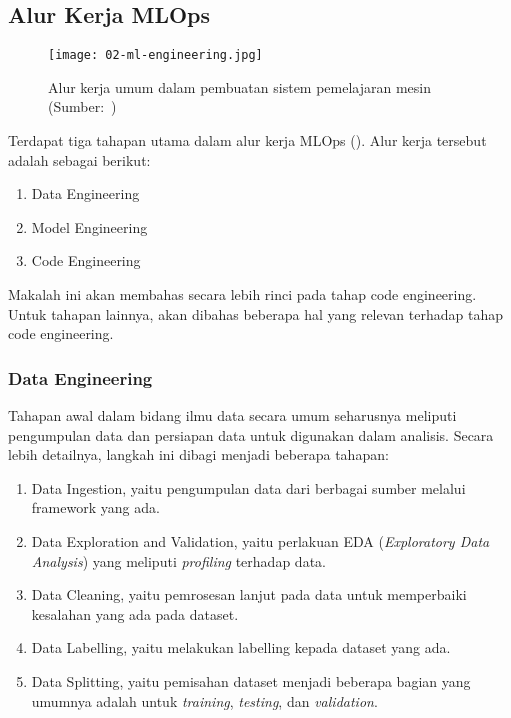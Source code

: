 \subsection{Alur Kerja MLOps}

\begin{figure}[ht]
  \vspace{\baselineskip}
  \centering
  \texttt{[image: 02-ml-engineering.jpg]}
  \captionsetup{justification=centering}
  \caption{Alur kerja umum dalam pembuatan sistem pemelajaran mesin (Sumber:~\cite{mlopsorg})}
\end{figure}

Terdapat tiga tahapan utama dalam alur kerja MLOps (\cite{mlopsorg}).
Alur kerja tersebut adalah sebagai berikut:
\begin{enumerate}
  \item Data Engineering
  \item Model Engineering
  \item Code Engineering
\end{enumerate}

Makalah ini akan membahas secara lebih rinci pada tahap code engineering.
Untuk tahapan lainnya, akan dibahas beberapa hal yang relevan terhadap tahap code engineering.

\subsubsection{Data Engineering}

Tahapan awal dalam bidang ilmu data secara umum seharusnya meliputi pengumpulan data dan persiapan data untuk digunakan dalam analisis.
Secara lebih detailnya, langkah ini dibagi menjadi beberapa tahapan:
\begin{enumerate}
  \item Data Ingestion, yaitu pengumpulan data dari berbagai sumber melalui framework yang ada. 
  \item Data Exploration and Validation, yaitu perlakuan EDA (\textit{Exploratory Data Analysis}) yang meliputi \textit{profiling} terhadap data.
  \item Data Cleaning, yaitu pemrosesan lanjut pada data untuk memperbaiki kesalahan yang ada pada dataset.
  \item Data Labelling, yaitu melakukan labelling kepada dataset yang ada.
  \item Data Splitting, yaitu pemisahan dataset menjadi beberapa bagian yang umumnya adalah untuk \textit{training}, \textit{testing}, dan \textit{validation}.
\end{enumerate}

